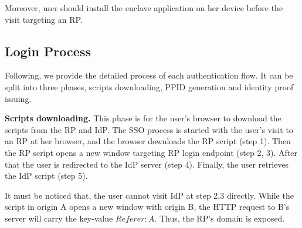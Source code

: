 Moreover, user should install the enclave application on her device before the visit targeting an RP. 

\subsection{Login Process}
Following, we provide the detailed process of each authentication flow.
It can be split into three phases, scripts downloading, PPID generation and identity proof issuing. 

\vspace{0.5mm}\noindent\textbf{Scripts downloading.} This phase is for the user’s browser to download the scripts from the RP and IdP. The SSO process is started with the user's visit to an RP at her browser, and the browser downloads the RP script (step 1). Then the RP script opens a new window targeting RP login endpoint (step 2, 3). After that the user is redirected to the IdP server (step 4). Finally, the user retrieves the IdP script (step 5).

It must be noticed that, the user cannot visit IdP at step 2,3 directly. While the script in origin A opens a new window with origin B, the HTTP request to B's server will carry the key-value $Referer: A$. Thus, the RP's domain is exposed.%

